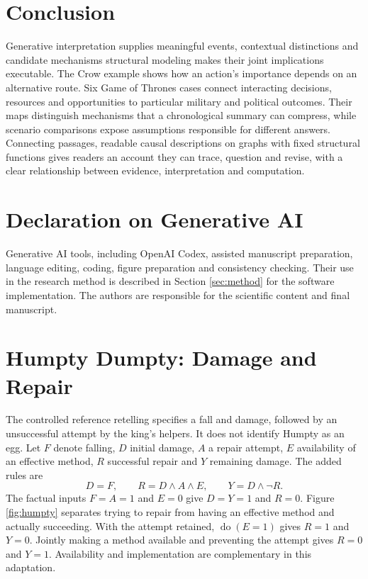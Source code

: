 \documentclass{svproc}
\newcommand{\doop}{\operatorname{do}}
\begin{document}
\section{Conclusion}
Generative interpretation supplies meaningful events, contextual distinctions and candidate mechanisms structural modeling makes their joint implications executable. The Crow example shows how an action's importance depends on an alternative route. Six Game of Thrones cases connect interacting decisions, resources and opportunities to particular military and political outcomes. Their maps distinguish mechanisms that a chronological summary can compress, while scenario comparisons expose assumptions responsible for different answers. Connecting passages, readable causal descriptions on graphs with fixed structural functions gives readers an account they can trace, question and revise, with a clear relationship between evidence, interpretation and computation.

\section*{Declaration on Generative AI}
Generative AI tools, including OpenAI Codex, assisted manuscript preparation, language editing, coding, figure preparation and consistency checking. Their use in the research method is described in Section \ref{sec:method} for the software implementation. The authors are responsible for the scientific content and final manuscript.
\label{sec:main-end}
\clearpage


\clearpage
\appendix

\section{Humpty Dumpty: Damage and Repair}\label{app:humpty}
The controlled reference retelling specifies a fall and damage, followed by an unsuccessful attempt by the king's helpers. It does not identify Humpty as an egg. Let $F$ denote falling, $D$ initial damage, $A$ a repair attempt, $E$ availability of an effective method, $R$ successful repair and $Y$ remaining damage. The added rules are
\begin{equation}\label{eq:humpty}
 D=F,\qquad R=D\land A\land E,\qquad Y=D\land\neg R.
\end{equation}
The factual inputs $F=A=1$ and $E=0$ give $D=Y=1$ and $R=0$. Figure \ref{fig:humpty} separates trying to repair from having an effective method and actually succeeding. With the attempt retained, $\doop(E=1)$ gives $R=1$ and $Y=0$. Jointly making a method available and preventing the attempt gives $R=0$ and $Y=1$. Availability and implementation are complementary in this adaptation.
\end{document}
